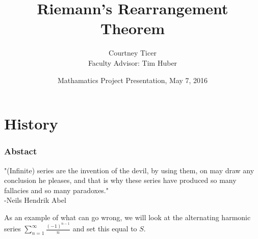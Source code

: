 \documentclass{beamer}
\begin{document}
\title[Riemann's Rearrangement Theorem]{Riemann's Rearrangement Theorem}
\author[C. Ticer, T. Huber]{Courtney Ticer\\Faculty Advisor: Tim Huber}
\date[Math Project Presentation]{Mathamatics Project Presentation, May 7, 2016}


\begin{frame}
\titlepage %
\end{frame}


\section{History} %

\begin{frame}
\frametitle{Abstact}
"(Infinite) series are the invention of the devil, by using them, on may draw any conclusion he pleases, and that is why these series have produced so many fallacies and so many paradoxes." \\-Neils Hendrik Abel 
\end{frame}


\begin{frame}
As an example of what can go wrong, we will look at the alternating harmonic series $\sum_{n=1}^{\infty}\frac{(-1)^{n-1}}{n}$ and set this equal to $S$.
\end{frame}

\end{document}
